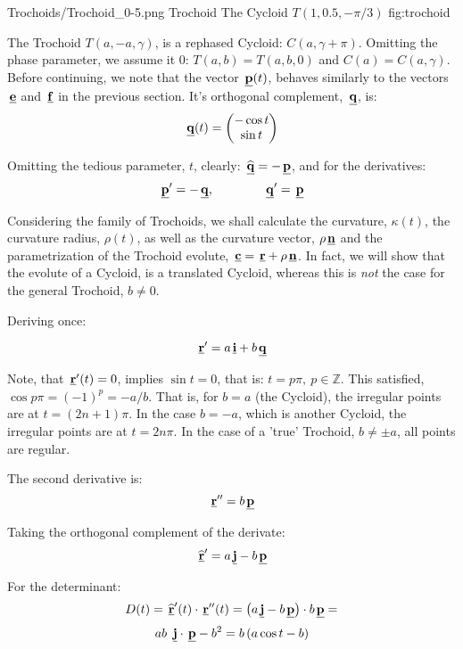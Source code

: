 \Figure
{Trochoids/Trochoid_0-5.png}
{Trochoid}
{
  The Cycloid $T(1,0.5,-\pi/3)$
}
{fig:trochoid}





The Trochoid $T(a,-a,\gamma)$, is a rephased Cycloid: $C(a,\gamma+\pi)$.
Omitting the phase parameter, we assume it $0$: $T(a,b)=T(a,b,0)$
and $C(a)=C(a,\gamma)$.
Before continuing, we note that the vector $\hspace{0.05cm} \underline{\mathbf{p}}(t)$, behaves similarly
to the vectors $\hspace{0.05cm} \underline{\mathbf{e}}$ and $\hspace{0.05cm} \underline{\mathbf{f}}$ in the previous section. 
It's orthogonal complement, $\hspace{0.05cm} \underline{\mathbf{q}}$, is:
\[
  \hspace{0.05cm} \underline{\mathbf{q}}(t)
  =
  \begin{pmatrix}
   -\cos{t}\\\sin{t}
  \end{pmatrix}
\]

Omitting the tedious parameter, $t$, clearly: 
$\hspace{0.05cm} \underline{\mathbf{\widehat{q}}}=-\hspace{0.05cm} \underline{\mathbf{p}}$, and for the derivatives:
\[
 \hspace{0.05cm} \underline{\mathbf{p}}'
 =
 -\hspace{0.05cm} \underline{\mathbf{q}},
 \qquad \qquad
 \hspace{0.05cm} \underline{\mathbf{q}}'
 =
 \hspace{0.05cm} \underline{\mathbf{p}}
\]

Considering the family of Trochoids, we shall calculate the curvature, $\kappa(t)$,
the curvature radius, $\rho(t)$, as well as the curvature vector,
$\rho \hspace{0.05cm} \underline{\mathbf{n}}$
and the parametrization of the Trochoid evolute, 
$\hspace{0.05cm} \underline{\mathbf{c}}=\hspace{0.05cm} \underline{\mathbf{r}}+\rho \hspace{0.05cm} \underline{\mathbf{n}}$. In fact, we will show that
the evolute of a Cycloid, is a translated Cycloid, whereas this is \emph{not}
the case for the general Trochoid, $b \neq 0$.

Deriving once:

\[
 \hspace{0.05cm} \underline{\mathbf{r}}'
 =
 a \hspace{0.05cm} \underline{\mathbf{i}}
 +
 b \hspace{0.05cm} \underline{\mathbf{q}}
\]

Note, that $\hspace{0.05cm} \underline{\mathbf{r}}'(t)=0$, implies 
$\sin{t}=0$, that is: $t=p \pi, ~  p \in \mathbb{Z}$.
This satisfied, $\cos{p \pi}=(-1)^p=-a/b$. That is,
for $b=a$ (the Cycloid), the irregular points
are at $t=(2n+1)\pi$. In the case
$b=-a$, which is another Cycloid, the irregular points
are at $t=2n \pi$. In the case of a 'true' Trochoid, $b \neq \pm a$, all points
are regular.

The second derivative is:
\[
 \hspace{0.05cm} \underline{\mathbf{r}}''
 =
 b \hspace{0.05cm} \underline{\mathbf{p}}
\]

Taking the orthogonal complement of the derivate:
\[
 \hspace{0.05cm} \underline{\mathbf{ \widehat{r} }}'
 =
 a \hspace{0.05cm} \underline{\mathbf{j}}
 -
 b \hspace{0.05cm} \underline{\mathbf{p}}
\]


For the determinant:
\[
 D(t)
 =
 \hspace{0.05cm} \underline{\mathbf{ \widehat{r} }}'(t) \cdot \hspace{0.05cm} \underline{\mathbf{ r}}''(t)
 =
 \left(
    a \hspace{0.05cm} \underline{\mathbf{j}}
    -
    b \hspace{0.05cm} \underline{\mathbf{p}}
 \right)
 \cdot
 b \hspace{0.05cm} \underline{\mathbf{p}}
  =
\]
\[
 ab~
 \hspace{0.05cm} \underline{\mathbf{j}} \cdot \hspace{0.05cm} \underline{\mathbf{p}}
 -
 b^2
 =
 b \left(
   a \cos{t}-b
 \right)
\]

